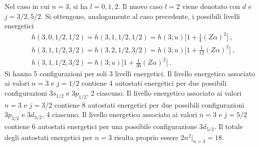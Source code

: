 \documentclass[12pt,a4paper]{report}
\numberwithin{equation}{section}
\numberwithin{section}{chapter}
\begin{document}
	Nel caso in cui $n=3$, si ha $l=0,1,2$. Il nuovo caso $l=2$ viene denotato con $d$ e $j=3/2,5/2$. Si ottengono, analogamente al caso precedente, i possibili livelli energetici
	\begin{align}
	&h(3,0,1/2,1/2) = h(3,1,1/2,1/2) = h(3;u)\bigg[1+\frac{1}{4}(Z\alpha)^2\bigg]~,\label{appteo45}\\
	&h(3,1,1/2,3/2) = h(3,2,1/2,3/2) = h(3;u)\bigg[1+\frac{1}{12}(Z\alpha)^2\bigg]~,\label{appteo46}\\
	&h(3,1,1/2,3/2) = h(3;u)\bigg[1+\frac{1}{36}(Z\alpha)^2\bigg]\label{appteo47}~.
	\end{align}
	Si hanno 5 configurazioni per soli 3 livelli energetici. Il livello energetico associato ai valori $n=3$ e $j=1/2$ contiene 4 autostati energetici per due possibili configurazioni $3s_{1/2}$ e $3p_{1/2}$, 2 ciascuno. Il livello energetico associato ai valori $n=3$ e $j=3/2$ contiene 8 autostati energetici per due possibili configurazioni $3p_{3/2}$ e $3d_{3/2}$, 4 ciascuno. Il livello energetico associato ai valori $n=3$ e $j=5/2$ contiene 6 autostati energetici per una possibile configurazione $3d_{5/2}$. Il totale degli autostati energetici per $n=3$ risulta proprio essere $2n^2|_{n=3}=18$.
	
\end{document}
